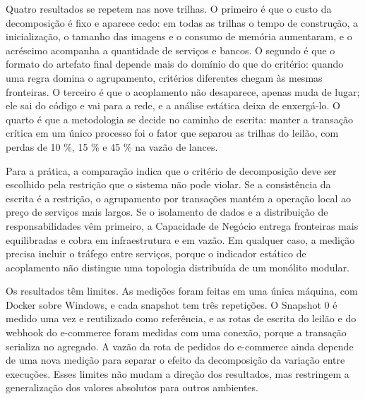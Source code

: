 Quatro resultados se repetem nas nove trilhas. O primeiro é que o custo da decomposição é fixo e aparece cedo: em todas as trilhas o tempo de construção, a inicialização, o tamanho das imagens e o consumo de memória aumentaram, e o acréscimo acompanha a quantidade de serviços e bancos. O segundo é que o formato do artefato final depende mais do domínio do que do critério: quando uma regra domina o agrupamento, critérios diferentes chegam às mesmas fronteiras. O terceiro é que o acoplamento não desaparece, apenas muda de lugar; ele sai do código e vai para a rede, e a análise estática deixa de enxergá-lo. O quarto é que a metodologia se decide no caminho de escrita: manter a transação crítica em um único processo foi o fator que separou as trilhas do leilão, com perdas de 10 \%, 15 \% e 45 \% na vazão de lances.

Para a prática, a comparação indica que o critério de decomposição deve ser escolhido pela restrição que o sistema não pode violar. Se a consistência da escrita é a restrição, o agrupamento por transações mantém a operação local ao preço de serviços mais largos. Se o isolamento de dados e a distribuição de responsabilidades vêm primeiro, a Capacidade de Negócio entrega fronteiras mais equilibradas e cobra em infraestrutura e em vazão. Em qualquer caso, a medição precisa incluir o tráfego entre serviços, porque o indicador estático de acoplamento não distingue uma topologia distribuída de um monólito modular.

Os resultados têm limites. As medições foram feitas em uma única máquina, com Docker sobre Windows, e cada snapshot tem três repetições. O Snapshot 0 é medido uma vez e reutilizado como referência, e as rotas de escrita do leilão e do webhook do e-commerce foram medidas com uma conexão, porque a transação serializa no agregado. A vazão da rota de pedidos do e-commerce ainda depende de uma nova medição para separar o efeito da decomposição da variação entre execuções. Esses limites não mudam a direção dos resultados, mas restringem a generalização dos valores absolutos para outros ambientes.

